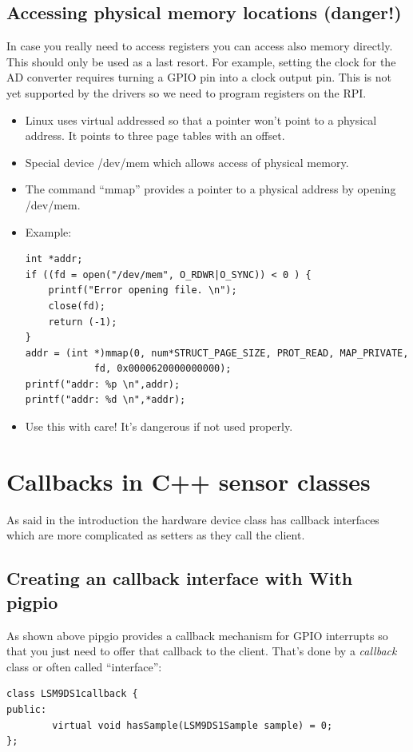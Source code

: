\documentclass[12pt]{report}
\begin{document}
\subsection{Accessing physical memory locations (danger!)}
In case you really need to access registers you can access
also memory directly. This should only be used as a last resort.
For example, setting the clock for the AD converter requires
turning a GPIO pin into a clock output pin. This is not yet
supported by the drivers so we need to program registers
on the RPI.
\begin{itemize}
\item Linux uses virtual addressed so that a pointer won't
point to a physical address. It points to three page
tables with an offset.
\item Special device /dev/mem which allows access of physical
memory.
\item The command ``mmap'' provides a pointer to a physical
address by opening /dev/mem.
\item Example:
\begin{verbatim}
int *addr;
if ((fd = open("/dev/mem", O_RDWR|O_SYNC)) < 0 ) {
    printf("Error opening file. \n");
    close(fd);
    return (-1);
}
addr = (int *)mmap(0, num*STRUCT_PAGE_SIZE, PROT_READ, MAP_PRIVATE,
            fd, 0x0000620000000000);
printf("addr: %p \n",addr);
printf("addr: %d \n",*addr);
\end{verbatim}
\item Use this with care! It's dangerous if not used properly.
\end{itemize}




\section{Callbacks in C++ sensor classes}
As said in the introduction the hardware device class has callback interfaces
which are more complicated as setters as they call the client.

\subsection{Creating an callback interface with With pigpio}
As shown above pipgio provides a callback mechanism for GPIO
interrupts so that you just need to offer that callback to the client.
That's done by a \textsl{callback} class or often called
``interface'':
\begin{verbatim}
class LSM9DS1callback {
public:
        virtual void hasSample(LSM9DS1Sample sample) = 0;
};
\end{verbatim}
\end{document}
